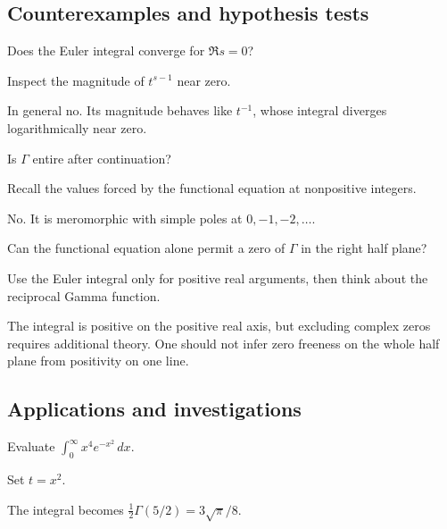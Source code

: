 \subsection*{Counterexamples and hypothesis tests}

\begin{exercise}\label{exr:iv19-expand-10}
Does the Euler integral converge for \(\Re s=0\)?
\end{exercise}
\begin{hint}
Inspect the magnitude of \(t^{s-1}\) near zero.
\end{hint}
\begin{solution}
In general no. Its magnitude behaves like \(t^{-1}\), whose integral diverges logarithmically near zero.
\end{solution}

\begin{exercise}\label{exr:iv19-expand-11}
Is \(\Gamma\) entire after continuation?
\end{exercise}
\begin{hint}
Recall the values forced by the functional equation at nonpositive integers.
\end{hint}
\begin{solution}
No. It is meromorphic with simple poles at \(0,-1,-2,\ldots\).
\end{solution}

\begin{exercise}\label{exr:iv19-expand-12}
Can the functional equation alone permit a zero of \(\Gamma\) in the right half plane?
\end{exercise}
\begin{hint}
Use the Euler integral only for positive real arguments, then think about the reciprocal Gamma function.
\end{hint}
\begin{solution}
The integral is positive on the positive real axis, but excluding complex zeros requires additional theory. One should not infer zero freeness on the whole half plane from positivity on one line.
\end{solution}

\subsection*{Applications and investigations}

\begin{exercise}\label{exr:iv19-expand-13}
Evaluate \(\int_0^\infty x^4e^{-x^2}\,dx\).
\end{exercise}
\begin{hint}
Set \(t=x^2\).
\end{hint}
\begin{solution}
The integral becomes \(\frac12\Gamma(5/2)=3\sqrt{\pi}/8\).
\end{solution}

